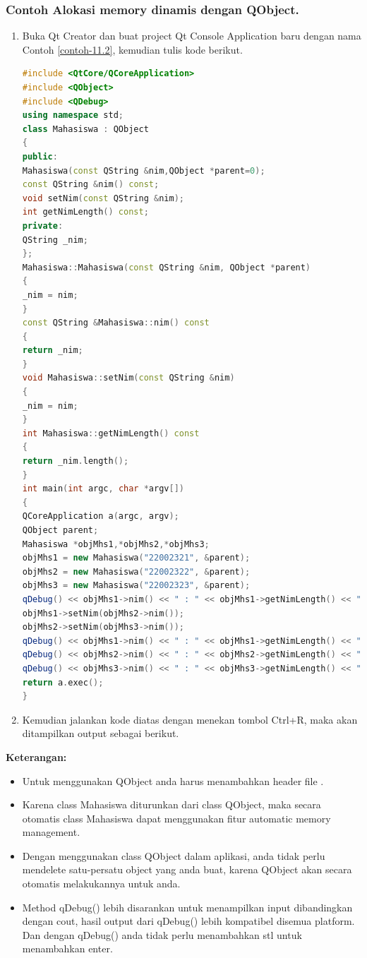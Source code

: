 \subsubsection*{Contoh  Alokasi memory dinamis dengan QObject.}

\begin{enumerate}

\item
  Buka Qt Creator dan buat project Qt Console Application baru dengan
  nama Contoh \ref{contoh-11.2}, kemudian tulis kode berikut.

\begin{lstlisting}[language=c++, caption=Alokasi memory dinamis dengan QObject, label=contoh-11.2]
#include <QtCore/QCoreApplication>
#include <QObject>
#include <QDebug>
using namespace std;
class Mahasiswa : QObject
{
public:
Mahasiswa(const QString &nim,QObject *parent=0);
const QString &nim() const;
void setNim(const QString &nim);
int getNimLength() const;
private:
QString _nim;
};
Mahasiswa::Mahasiswa(const QString &nim, QObject *parent)
{
_nim = nim;
}
const QString &Mahasiswa::nim() const
{
return _nim;
}
void Mahasiswa::setNim(const QString &nim)
{
_nim = nim;
}
int Mahasiswa::getNimLength() const
{
return _nim.length();
}
int main(int argc, char *argv[])
{
QCoreApplication a(argc, argv);
QObject parent;
Mahasiswa *objMhs1,*objMhs2,*objMhs3;
objMhs1 = new Mahasiswa("22002321", &parent);
objMhs2 = new Mahasiswa("22002322", &parent);
objMhs3 = new Mahasiswa("22002323", &parent);
qDebug() << objMhs1->nim() << " : " << objMhs1->getNimLength() << " kar";
objMhs1->setNim(objMhs2->nim());
objMhs2->setNim(objMhs3->nim());
qDebug() << objMhs1->nim() << " : " << objMhs1->getNimLength() << " kar";
qDebug() << objMhs2->nim() << " : " << objMhs2->getNimLength() << " kar";
qDebug() << objMhs3->nim() << " : " << objMhs3->getNimLength() << " kar";
return a.exec();
}
\end{lstlisting}
\item
  Kemudian jalankan kode diatas dengan menekan tombol Ctrl+R, maka akan
  ditampilkan output sebagai berikut.
\end{enumerate}

\textbf{Keterangan:}

\begin{itemize}

\item
  Untuk menggunakan QObject anda harus menambahkan header file .
\item
  Karena class Mahasiswa diturunkan dari class QObject, maka secara
  otomatis class Mahasiswa dapat menggunakan fitur automatic memory
  management.
\item
  Dengan menggunakan class QObject dalam aplikasi, anda tidak perlu
  mendelete satu-persatu object yang anda buat, karena QObject akan
  secara otomatis melakukannya untuk anda.
\item
  Method qDebug() lebih disarankan untuk menampilkan input dibandingkan
  dengan cout, hasil output dari qDebug() lebih kompatibel disemua
  platform. Dan dengan qDebug() anda tidak perlu menambahkan stl untuk
  menambahkan enter.
\end{itemize}

